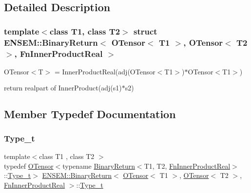 \subsection{Detailed Description}
\subsubsection*{template$<$class T1, class T2$>$\newline
struct E\+N\+S\+E\+M\+::\+Binary\+Return$<$ O\+Tensor$<$ T1 $>$, O\+Tensor$<$ T2 $>$, Fn\+Inner\+Product\+Real $>$}

O\+Tensor$<$\+T$>$ = Inner\+Product\+Real(adj(\+O\+Tensor$<$\+T1$>$)$\ast$\+O\+Tensor$<$\+T1$>$) 

return realpart of Inner\+Product(adj(s1)$\ast$s2) 

\subsection{Member Typedef Documentation}
\mbox{\label{structENSEM_1_1BinaryReturn_3_01OTensor_3_01T1_01_4_00_01OTensor_3_01T2_01_4_00_01FnInnerProductReal_01_4_a4be584e269222cdb3c377aa0b77b45e3}} 
\subsubsection{\texorpdfstring{Type\_t}{Type\_t}\hspace{0.1cm}{\footnotesize\ttfamily [1/3]}}
{\footnotesize\ttfamily template$<$class T1 , class T2 $>$ \\
typedef \mbox{\hyperlink{classENSEM_1_1OTensor}{O\+Tensor}}$<$typename \mbox{\hyperlink{structENSEM_1_1BinaryReturn}{Binary\+Return}}$<$T1, T2, \mbox{\hyperlink{structENSEM_1_1FnInnerProductReal}{Fn\+Inner\+Product\+Real}}$>$\+::\mbox{\hyperlink{structENSEM_1_1BinaryReturn_3_01OTensor_3_01T1_01_4_00_01OTensor_3_01T2_01_4_00_01FnInnerProductReal_01_4_a4be584e269222cdb3c377aa0b77b45e3}{Type\+\_\+t}}$>$ \mbox{\hyperlink{structENSEM_1_1BinaryReturn}{E\+N\+S\+E\+M\+::\+Binary\+Return}}$<$ \mbox{\hyperlink{classENSEM_1_1OTensor}{O\+Tensor}}$<$ T1 $>$, \mbox{\hyperlink{classENSEM_1_1OTensor}{O\+Tensor}}$<$ T2 $>$, \mbox{\hyperlink{structENSEM_1_1FnInnerProductReal}{Fn\+Inner\+Product\+Real}} $>$\+::\mbox{\hyperlink{structENSEM_1_1BinaryReturn_3_01OTensor_3_01T1_01_4_00_01OTensor_3_01T2_01_4_00_01FnInnerProductReal_01_4_a4be584e269222cdb3c377aa0b77b45e3}{Type\+\_\+t}}}

